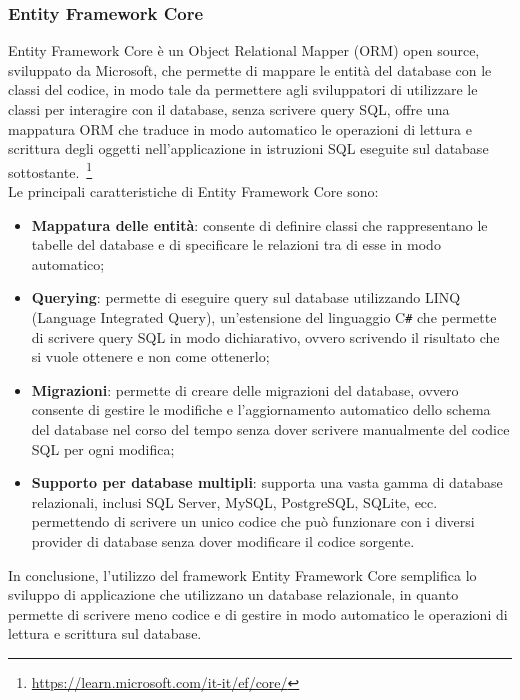 \subsubsection{Entity Framework Core}
Entity Framework Core è un Object Relational Mapper (ORM) open source, sviluppato da Microsoft, che permette di mappare le entità del database con le classi del codice, in modo tale da permettere agli sviluppatori di utilizzare le classi per interagire con il database, senza scrivere query SQL, offre una mappatura ORM che traduce in modo automatico le operazioni di lettura e scrittura degli oggetti nell'applicazione in istruzioni SQL eseguite sul database sottostante.~\footnote{\url{https://learn.microsoft.com/it-it/ef/core/}}\\
Le principali caratteristiche di Entity Framework Core sono:
\begin{itemize}
\item \textbf{Mappatura delle entità}: consente di definire classi che rappresentano le tabelle del database e di specificare le relazioni tra di esse in modo automatico;
\item \textbf{Querying}: permette di eseguire query sul database utilizzando LINQ (Language Integrated Query), un'estensione del linguaggio C\texttt{\#} che permette di scrivere query SQL in modo dichiarativo, ovvero scrivendo il risultato che si vuole ottenere e non come ottenerlo;
\item \textbf{Migrazioni}: permette di creare delle migrazioni del database, ovvero consente di gestire le modifiche e l'aggiornamento automatico dello schema del database nel corso del tempo senza dover scrivere manualmente del codice SQL per ogni modifica;
\item \textbf{Supporto per database multipli}: supporta una vasta gamma di database relazionali, inclusi SQL Server, MySQL, PostgreSQL, SQLite, ecc. permettendo di scrivere un unico codice che può funzionare con i diversi provider di database senza dover modificare il codice sorgente.
\end{itemize}
In conclusione, l'utilizzo del framework Entity Framework Core semplifica lo sviluppo di applicazione che utilizzano un database relazionale, in quanto permette di scrivere meno codice e di gestire in modo automatico le operazioni di lettura e scrittura sul database.\\
